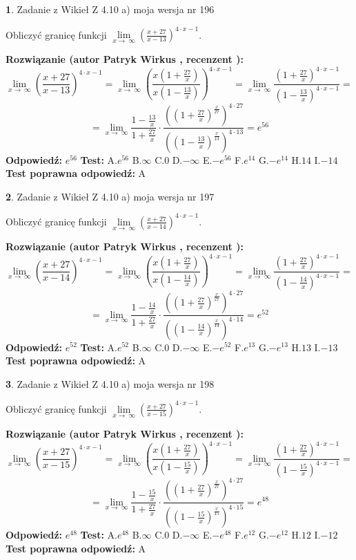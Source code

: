 \documentclass[12pt, a4paper]{article}
\theoremstyle{definition} %
\newtheorem{zad}{}
\newcommand{\zadStart}[1]{\begin{zad}#1\newline}
\newcommand{\zadStop}{\end{zad}}
\newcommand{\rozwStart}[2]{\noindent \textbf{Rozwiązanie (autor #1 , recenzent #2): }\newline}
\newcommand{\rozwStop}{\newline}
\newcommand{\odpStart}{\noindent \textbf{Odpowiedź:}\newline}
\newcommand{\odpStop}{\newline}
\newcommand{\testStart}{\noindent \textbf{Test:}\newline}
\newcommand{\testStop}{\newline}
\newcommand{\kluczStart}{\noindent \textbf{Test poprawna odpowiedź:}\newline}
\newcommand{\kluczStop}{\newline}
\begin{document}
\zadStart{Zadanie z Wikieł Z 4.10 a) moja wersja nr 196}

Obliczyć granicę funkcji  $\lim\limits_{x\to\ \infty}(\frac{x+27}{x-13})^{4\cdot x-1}$.
\zadStop
\rozwStart{Patryk Wirkus}{}
$$\lim\limits_{x\to\ \infty}(\frac{x+27}{x-13})^{4\cdot x-1} = \lim\limits_{x\to\ \infty}(\frac{x(1+\frac{27}{x})}{x(1-\frac{13}{x})})^{4\cdot x-1}=\lim\limits_{x\to\ \infty}\frac{(1+\frac{27}{x})^{4\cdot x-1}}{(1-\frac{13}{x})^{4\cdot x-1}}=$$
$$=\lim\limits_{x\to\ \infty}\frac{1-\frac{13}{x}}{1+\frac{27}{x}}\cdot\frac{((1+\frac{27}{x})^{\frac{x}{27}})^{4\cdot27}}{((1-\frac{13}{x})^{\frac{x}{13}})^{4\cdot13}}=e^{56}$$
\rozwStop
\odpStart
$e^{56}$
\odpStop
\testStart
A.$e^{56}$ B.$\infty$ C.$0$ D.$-\infty$ E.$-e^{56}$
F.$e^{14}$ G.$-e^{14}$
H.$14$
I.$-14$
\testStop
\kluczStart
A
\kluczStop



\zadStart{Zadanie z Wikieł Z 4.10 a) moja wersja nr 197}

Obliczyć granicę funkcji  $\lim\limits_{x\to\ \infty}(\frac{x+27}{x-14})^{4\cdot x-1}$.
\zadStop
\rozwStart{Patryk Wirkus}{}
$$\lim\limits_{x\to\ \infty}(\frac{x+27}{x-14})^{4\cdot x-1} = \lim\limits_{x\to\ \infty}(\frac{x(1+\frac{27}{x})}{x(1-\frac{14}{x})})^{4\cdot x-1}=\lim\limits_{x\to\ \infty}\frac{(1+\frac{27}{x})^{4\cdot x-1}}{(1-\frac{14}{x})^{4\cdot x-1}}=$$
$$=\lim\limits_{x\to\ \infty}\frac{1-\frac{14}{x}}{1+\frac{27}{x}}\cdot\frac{((1+\frac{27}{x})^{\frac{x}{27}})^{4\cdot27}}{((1-\frac{14}{x})^{\frac{x}{14}})^{4\cdot14}}=e^{52}$$
\rozwStop
\odpStart
$e^{52}$
\odpStop
\testStart
A.$e^{52}$ B.$\infty$ C.$0$ D.$-\infty$ E.$-e^{52}$
F.$e^{13}$ G.$-e^{13}$
H.$13$
I.$-13$
\testStop
\kluczStart
A
\kluczStop



\zadStart{Zadanie z Wikieł Z 4.10 a) moja wersja nr 198}

Obliczyć granicę funkcji  $\lim\limits_{x\to\ \infty}(\frac{x+27}{x-15})^{4\cdot x-1}$.
\zadStop
\rozwStart{Patryk Wirkus}{}
$$\lim\limits_{x\to\ \infty}(\frac{x+27}{x-15})^{4\cdot x-1} = \lim\limits_{x\to\ \infty}(\frac{x(1+\frac{27}{x})}{x(1-\frac{15}{x})})^{4\cdot x-1}=\lim\limits_{x\to\ \infty}\frac{(1+\frac{27}{x})^{4\cdot x-1}}{(1-\frac{15}{x})^{4\cdot x-1}}=$$
$$=\lim\limits_{x\to\ \infty}\frac{1-\frac{15}{x}}{1+\frac{27}{x}}\cdot\frac{((1+\frac{27}{x})^{\frac{x}{27}})^{4\cdot27}}{((1-\frac{15}{x})^{\frac{x}{15}})^{4\cdot15}}=e^{48}$$
\rozwStop
\odpStart
$e^{48}$
\odpStop
\testStart
A.$e^{48}$ B.$\infty$ C.$0$ D.$-\infty$ E.$-e^{48}$
F.$e^{12}$ G.$-e^{12}$
H.$12$
I.$-12$
\testStop
\kluczStart
A
\kluczStop
\end{document}
